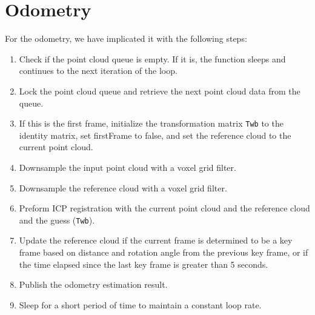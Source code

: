 \section{Odometry}
For the odometry, we have implicated it with the following steps:
\begin{enumerate}
    \item Check if the point cloud queue is empty. If it is, the function sleeps and continues to the next iteration of the loop.
    \item Lock the point cloud queue and retrieve the next point cloud data from the queue.
    \item If this is the first frame, initialize the transformation matrix \texttt{Twb} to the identity matrix, set firstFrame to false, and set the reference cloud to the current point cloud.
    \item Downsample the input point cloud with a voxel grid filter.
    \item Downsample the reference cloud with a voxel grid filter.
    \item Preform ICP registration with the current point cloud and the reference cloud and the guess (\texttt{Twb}).
    \item Update the reference cloud if the current frame is determined to be a key frame based on distance and rotation angle from the previous key frame, or if the time elapsed since the last key frame is greater than 5 seconds.
    \item Publish the odometry estimation result.
    \item Sleep for a short period of time to maintain a constant loop rate.
\end{enumerate}